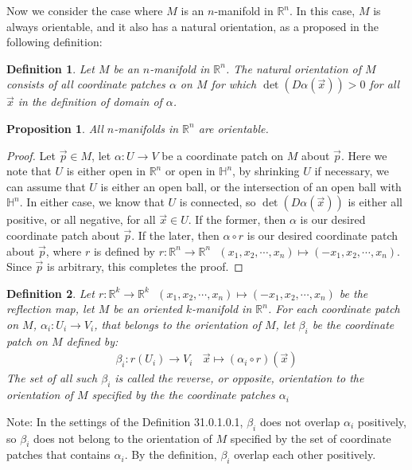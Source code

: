 \documentclass[11pt,oneside]{book}
\theoremstyle{break}
\theoremstyle{break}
\newtheorem{prop}[lem]{Proposition}
\newtheorem{defn}{Definition}[corL]
\newcommand{\R}{\mathbb{R}}
\newcommand{\note}{\color{red}Note: \color{black}}
\begin{document}
Now we consider the case where $M$ is an $n$-manifold in $\R^n$. In this case, $M$ is always orientable, and it also has a natural orientation, as a proposed in the following definition:
\begin{defn}
Let $M$ be an $n$-manifold in $\R^n$. The natural orientation of $M$ consists of all coordinate patches $\alpha$ on $M$ for which $\det(D\alpha(\vec{x})) >0$ for all $\vec{x}$ in the definition of domain of $\alpha$. 
\end{defn}

\begin{prop} All $n$-manifolds in $\R^n$ are orientable. 
\end{prop}
\begin{proof}
Let $\vec{p}\in M$, let $\alpha:U \to V$ be a coordinate patch on $M$ about $\vec{p}$. Here we note that $U$ is either open in $\R^n$ or open in $\mathbb{H}^n$, by shrinking $U$ if necessary, we can assume that $U$ is either an open ball, or the intersection of an open ball with $\mathbb{H}^n$. In either case, we know that $U$ is connected, so $\det(D\alpha(\vec{x}))$ is either all positive, or all negative, for all $\vec{x}\in U$. If the former, then $\alpha$ is our desired coordinate patch about $\vec{p}$. If the later, then $\alpha\circ r$ is our desired coordinate patch about $\vec{p}$, where $r$ is defined by $r:\R^n \to \R^n \ \ \ (x_1,x_2,\cdots, x_n) \mapsto (-x_1,x_2,\cdots, x_n)$. Since $\vec{p}$ is arbitrary, this completes the proof. 
\end{proof}

\begin{defn}
Let $r:\R^k \to \R^k \ \ \ (x_1,x_2,\cdots, x_n) \mapsto (-x_1,x_2,\cdots, x_n)$ be the reflection map, let $M$ be an oriented $k$-manifold in $\R^n$. For each coordinate patch on $M$, $\alpha_i :U_i \to V_i$, that belongs to the orientation of $M$, let $\beta_i $ be the coordinate patch on $M$ defined by:
\begin{align*}
\beta_i : r(U_i) \to V_i \ \ \ \ \vec{x}\mapsto (\alpha_i \circ r)(\vec{x})
\end{align*}
The set of all such $\beta_i$ is called the reverse, or opposite, orientation to the orientation of $M$ specified by the the coordinate patches $\alpha_i$
\end{defn}

\note In the settings of the Definition 31.0.1.0.1, $\beta_i$ does not overlap $\alpha_i$ positively, so $\beta_i$ does not belong to the orientation of $M$ specified by the set of coordinate patches that contains $\alpha_i$. By the definition, $\beta_i$ overlap each other positively. \\
\end{document}
